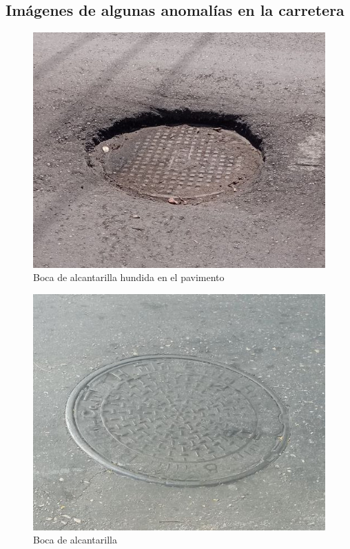\begin{appendices}
	\section*{Imágenes de algunas anomalías en la carretera}
		\begin{figure}[htb]
			  \centering
			  \includegraphics[scale = 0.4]{Graphics/pothole_3.jpg}
			  \caption{Boca de alcantarilla hundida en el pavimento}
			  \label{fig:15}
		\end{figure}

		\begin{figure}[htb]
			  \centering
			  \includegraphics[scale = 0.4]{Graphics/pothole_9.jpg}
			  \caption{Boca de alcantarilla}
			  \label{fig:16}
		\end{figure}
		\newpage


\end{appendices}

